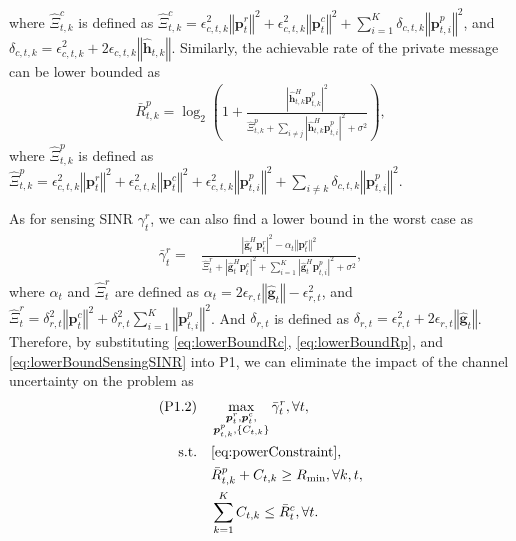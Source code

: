 \documentclass[twocolumn,journal]{IEEEtran}
\begin{document}
where \(\hat{\Xi}^{c}_{t,k}\) is defined as \(\hat{\Xi}^{c}_{t,k} = \epsilon_{c,t,k}^2\left\Vert \boldsymbol{p}_t^{r} \right\Vert^2 + \epsilon_{c,t,k}^2\left\Vert  \boldsymbol{p}_t^{c} \right\Vert^2 + \sum_{i=1}^{K} \delta_{c,t,k} \left\Vert \boldsymbol{p}^{p}_{t,i} \right\Vert^2\), and \(\delta_{c,t,k} = \epsilon_{c,t,k}^2 + 2\epsilon_{c,t,k}\left\Vert \hat{\boldsymbol{h}}_{t,k} \right\Vert\). Similarly, the achievable rate of the private message can be lower bounded as
\begin{align}
    \bar{R}^{p}_{t,k} = \log_2\left(1 + \frac{\left| \hat{\boldsymbol{h}}^{H}_{t,k}\boldsymbol{p}^{p}_{t,k} \right|^2}{\hat{\Xi}^{p}_{t,k} +  \sum_{i\neq j}\left| \hat{\boldsymbol{h}}^{H}_{t,k}\boldsymbol{p}^{p}_{t,i}\right|^2 + \sigma^2}\right), \label{eq:lowerBoundRp}
\end{align}
where \(\hat{\Xi}^{p}_{t,k}\) is defined as \(\hat{\Xi}^{p}_{t,k} = \epsilon_{c,t,k}^2\left\Vert \boldsymbol{p}_t^{r} \right\Vert^2 + \epsilon_{c,t,k}^2\left\Vert  \boldsymbol{p}_t^{c} \right\Vert^2 + \epsilon_{c,t,k}^2\left\Vert  \boldsymbol{p}^{p}_{t,i} \right\Vert^2 + \sum_{i\neq k}\delta_{c,t,k}\left\Vert \boldsymbol{p}^{p}_{t,i} \right\Vert^2\). 

As for sensing SINR \(\gamma_{t}^{r}\), we can also find a lower bound in the worst case as
\begin{align}
    \bar{\gamma}_{t}^{r} = &\frac{\left| \hat{\boldsymbol{g}}^{H}_{t}\boldsymbol{p}^{r}_{t} \right|^2-\alpha_t\left\Vert \boldsymbol{p}^{r}_{t}\right\Vert^2}
    {\hat{\Xi}^{r}_{t} + \left| \hat{\boldsymbol{g}}^{H}_{t}\boldsymbol{p}^{c}_{t}\right|^2 + \sum_{i=1}^{K}\left| \hat{\boldsymbol{g}}^{H}_{t}\boldsymbol{p}^{p}_{t,i}\right|^2 + \sigma^2},\label{eq:lowerBoundSensingSINR}
\end{align}    
where \(\alpha_t\) and \(\hat{\Xi}^{r}_{t}\) are defined as \(\alpha_t =2\epsilon_{r,t}\left\Vert \hat{\boldsymbol{g}}_{t} \right\Vert - \epsilon_{r,t}^2 \), and \(\hat{\Xi}^{r}_{t} = \delta_{r,t}^2\left\Vert \boldsymbol{p}_t^{c} \right\Vert^2 + \delta_{r,t}^2\sum_{i=1}^{K}\left\Vert \boldsymbol{p}^{p}_{t,i} \right\Vert^2\). And \(\delta_{r,t}\) is defined as \(\delta_{r,t} = \epsilon_{r,t}^2 + 2\epsilon_{r,t}\left\Vert \hat{\boldsymbol{g}}_{t} \right\Vert\).
Therefore, by substituting \eqref{eq:lowerBoundRc}, \eqref{eq:lowerBoundRp}, and \eqref{eq:lowerBoundSensingSINR} into P1, we can eliminate the impact of the channel uncertainty on the problem as
\begin{subequations}
\begin{align}
    (\text{P1.2})\quad&\mathop{\max}_{{\substack{\boldsymbol{p}^{r}_{t},\boldsymbol{p}^{c}_{t},\\
    \boldsymbol{p}^{p}_{t,k},\left\{C_{t,k}\right\}}}}\bar{\gamma}_t^{r}, \forall t,\label{eq:gammaR2}\\
    \text{s.t.}\quad&\eqref{eq:powerConstraint},\notag\\
    \quad&\bar{R}^{p}_{t,k} + C_{t,k} \geq R_{\min}, \forall k,t,\label{eq:rateConstraint2}\\
    & \sum_{k=1}^{K} C_{t,k} \leq \bar{R}^{c}_{t}, \forall t. \label{eq:splittedRateConstraint2}
\end{align}
\end{subequations}
\end{document}
